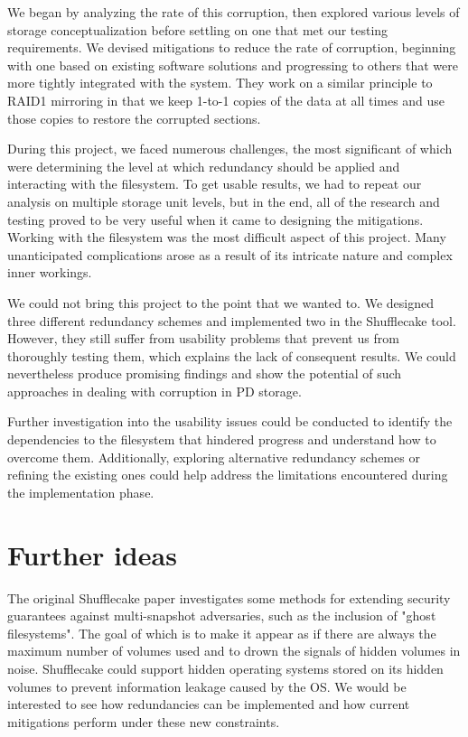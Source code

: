 \documentclass[a4paper,11pt,oneside]{report}
\begin{document}
We began by analyzing the rate of this corruption, then explored various levels of storage conceptualization before settling on one that met our testing requirements. We devised mitigations to reduce the rate of corruption, beginning with one based on existing software solutions and progressing to others that were more tightly integrated with the system. They work on a similar principle to RAID1 mirroring in that we keep 1-to-1 copies of the data at all times and use those copies to restore the corrupted sections.

During this project, we faced numerous challenges, the most significant of which were determining the level at which redundancy should be applied and interacting with the filesystem. To get usable results, we had to repeat our analysis on multiple storage unit levels, but in the end, all of the research and testing proved to be very useful when it came to designing the mitigations. Working with the filesystem was the most difficult aspect of this project. Many unanticipated complications arose as a result of its intricate nature and complex inner workings.

We could not bring this project to the point that we wanted to. We designed three different redundancy schemes and implemented two in the Shufflecake tool. However, they still suffer from usability problems that prevent us from thoroughly testing them, which explains the lack of consequent results. We could nevertheless produce promising findings and show the potential of such approaches in dealing with corruption in PD storage.

Further investigation into the usability issues could be conducted to identify the dependencies to the filesystem that hindered progress and understand how to overcome them. Additionally, exploring alternative redundancy schemes or refining the existing ones could help address the limitations encountered during the implementation phase.

\section{Further ideas}

The original Shufflecake paper investigates some methods for extending security guarantees against multi-snapshot adversaries, such as the inclusion of "ghost filesystems"\cite{Anzuoni:297353}. The goal of which is to make it appear as if there are always the maximum number of volumes used and to drown the signals of hidden volumes in noise. Shufflecake could support hidden operating systems stored on its hidden volumes to prevent information leakage caused by the OS. We would be interested to see how redundancies can be implemented and how current mitigations perform under these new constraints.
\end{document}
